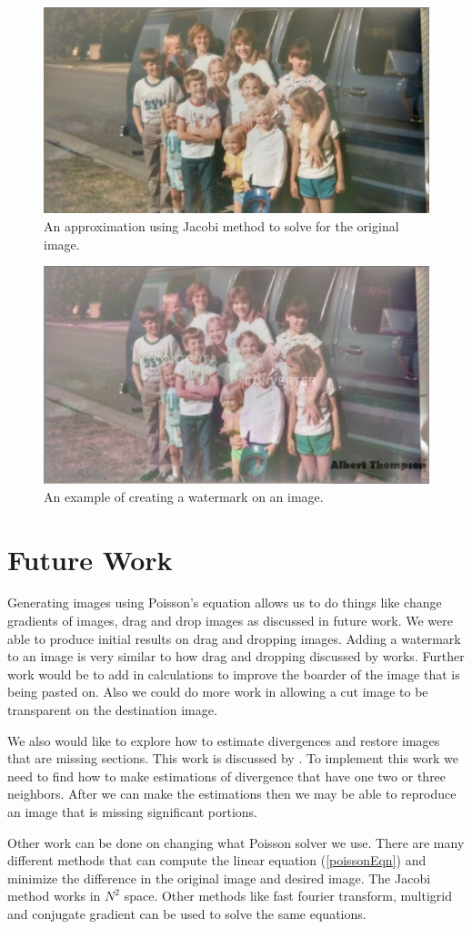 \documentclass[10pt,twopage]{acmsiggraph}
\begin{document}
\begin{figure}
\centering
\includegraphics[width=.44\textwidth]{fig/familyResult.jpg}
\caption{An approximation using Jacobi method to solve for the original image.}
\label{familyResult}
\end{figure}


\begin{figure}
\centering
\includegraphics[width=.44\textwidth]{fig/mask.jpg}
\caption{An example of creating a watermark on an image.}
\label{mask}
\end{figure}

\section{Future Work}

Generating images using Poisson's equation allows us to do things like change gradients of images, drag and drop images as discussed in future work. We were able to produce initial results on drag and dropping images. Adding a watermark to an image is very similar to how drag and dropping discussed by \cite{ddp} works. Further work would be to add in calculations to improve the boarder of the image that is being pasted on. Also we could do more work in allowing a cut image to be transparent on the destination image. 

We also would like to explore how to estimate divergences and restore images that are missing sections. This work is discussed by \cite{Perez}. To implement this work we need to find how to make estimations of divergence that have one two or three neighbors. After we can make the estimations then we may be able to reproduce an image that is missing significant portions. 

Other work can be done on changing what Poisson solver we use. There are many different methods that can compute the linear equation (\ref{poissonEqn}) and minimize the difference in the original image and desired image. The Jacobi method works in $N^2$ space. Other methods like fast fourier transform, multigrid and conjugate gradient can be used to solve the same equations.
\end{document}
